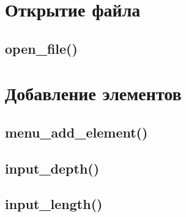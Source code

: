 \documentclass[12pt, a4paper]{article}
\begin{document}
\section{Открытие файла}

\subsection{open\_file()}









\section{Добавление элементов}

\subsection{menu\_add\_element()}







\subsection{input\_depth()}







\subsection{input\_length()}


\end{document}
